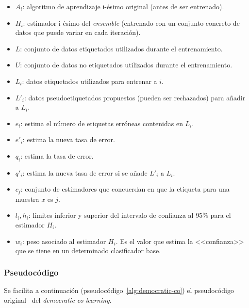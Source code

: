 \begin{itemize}
	\item $A_{i}$: algoritmo de aprendizaje i-ésimo original (antes de ser entrenado).
	\item $H_{i}$: estimador i-ésimo del \textit{ensemble} (entrenado con un conjunto concreto de datos que puede variar en cada iteración).
	\item $L$: conjunto de datos etiquetados utilizados durante el entrenamiento.
	\item $U$: conjunto de datos no etiquetados utilizados durante el entrenamiento.
	\item $L_{i}$: datos etiquetados utilizados para entrenar a $i$.
	\item $L'_{i}$: datos pseudoetiquetados propuestos (pueden ser rechazados) para añadir a $L_i$.
	\item $e_{i}$: estima el número de etiquetas erróneas contenidas en $L_i$.
	\item $e'_{i}$: estima la nueva tasa de error.
	\item $q_{i}$: estima la tasa de error.
	\item $q'_{i}$: estima la nueva tasa de error si se añade $L'_i$ a $L_i$.
	\item $c_{j}$:  conjunto de estimadores que concuerdan en que la etiqueta para una muestra $x$ es $j$.
	\item $l_i, h_i$: límites inferior y superior del intervalo de confianza al 95\% para el estimador $H_i$.
	\item $w_i$: peso asociado al estimador $H_i$. Es el valor que estima la <<confianza>> que se tiene en un determinado clasificador base.
\end{itemize} 

\subsubsection{Pseudocódigo}

Se facilita a continuación (pseudocódigo~\ref{alg:democratic-co}) el pseudocódigo original~\cite{democraticCoLearning2004original} del \textit{democratic-co learning}.

